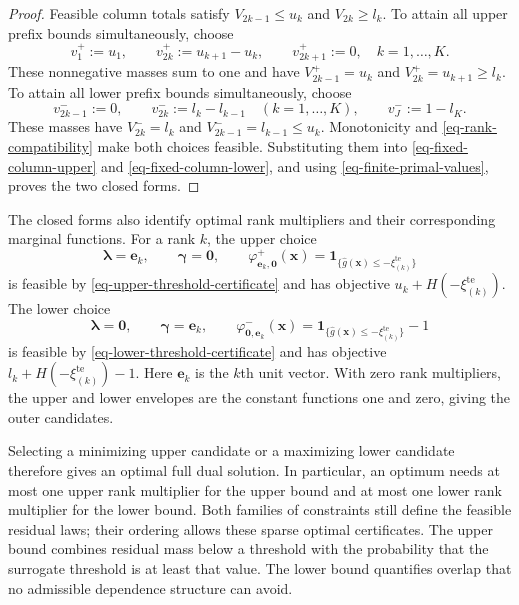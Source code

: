 \documentclass[review,11pt,3p,authoryear,nopreprintline]{elsarticle}
\begin{document}
\begin{proof}
  Feasible column totals satisfy $V_{2k-1}\le u_k$ and $V_{2k}\ge l_k$. To attain all upper prefix bounds simultaneously, choose
  \begin{equation}
    v_1^+:=u_1,\qquad
    v_{2k}^+:=u_{k+1}-u_k,\qquad
    v_{2k+1}^+:=0,\quad k=1,\ldots,K.
    \label{eq-upper-column-allocation}
  \end{equation}
  These nonnegative masses sum to one and have
  $V_{2k-1}^+=u_k$ and $V_{2k}^+=u_{k+1}\ge l_k$.
  To attain all lower prefix bounds simultaneously, choose
  \begin{equation}
    v_{2k-1}^-:=0,\qquad
    v_{2k}^-:=l_k-l_{k-1}\quad(k=1,\ldots,K),
    \qquad v_J^-:=1-l_K.
    \label{eq-lower-column-allocation}
  \end{equation}
  These masses have $V_{2k}^-=l_k$ and
  $V_{2k-1}^-=l_{k-1}\le u_k$.
  Monotonicity and \eqref{eq-rank-compatibility} make both choices feasible. Substituting them into \eqref{eq-fixed-column-upper} and \eqref{eq-fixed-column-lower}, and using \eqref{eq-finite-primal-values}, proves the two closed forms.
\end{proof}

The closed forms also identify optimal rank multipliers and their corresponding marginal functions. For a rank $k$, the upper choice
\[
  \bm\lambda=\bm e_k,\qquad \bm\gamma=\bm 0,\qquad
  \varphi^+_{\bm e_k,\bm 0}(\bm x)=\mathbf1_{\{\hat g(\bm x)\le-\xi_{(k)}^{\mathrm{te}}\}}
\]
is feasible by \eqref{eq-upper-threshold-certificate} and has objective $u_k+H\left(-\xi_{(k)}^{\mathrm{te}}\right)$. The lower choice
\[
  \bm\lambda=\bm 0,\qquad \bm\gamma=\bm e_k,\qquad
  \varphi^-_{\bm 0,\bm e_k}(\bm x)=\mathbf1_{\{\hat g(\bm x)\le-\xi_{(k)}^{\mathrm{te}}\}}-1
\]
is feasible by \eqref{eq-lower-threshold-certificate} and has objective $l_k+H\left(-\xi_{(k)}^{\mathrm{te}}\right)-1$. Here $\bm e_k$ is the $k$th unit vector. With zero rank multipliers, the upper and lower envelopes are the constant functions one and zero, giving the outer candidates.

Selecting a minimizing upper candidate or a maximizing lower candidate therefore gives an optimal full dual solution. In particular, an optimum needs at most one upper rank multiplier for the upper bound and at most one lower rank multiplier for the lower bound. Both families of constraints still define the feasible residual laws; their ordering allows these sparse optimal certificates. The upper bound combines residual mass below a threshold with the probability that the surrogate threshold is at least that value. The lower bound quantifies overlap that no admissible dependence structure can avoid.
\end{document}

